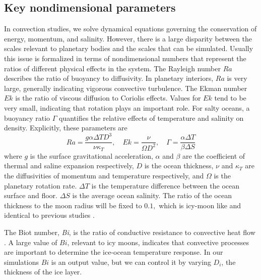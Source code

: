 \documentclass[12pt]{article}
\begin{document}
\subsection{Key nondimensional parameters}
In convection studies, we solve dynamical equations governing the conservation of energy, momentum, and salinity. However, there is a large disparity between the scales relevant to planetary bodies and the scales that can be simulated. 
Usually this issue is formalized in terms of nondimensional numbers that represent the ratios of different physical effects in the system. %
The Rayleigh number $Ra$ describes the ratio of buoyancy to diffusivity. In planetary interiors, $Ra$ is very large, generally indicating vigorous convective turbulence.
The Ekman number $Ek$ is the ratio of viscous diffusion to Coriolis effects. Values for $Ek$ tend to be very small, indicating that rotation plays an important role.
For salty oceans, a buoyancy ratio $\Gamma$ quantifies the relative effects of temperature and salinity on density.
Explicitly, these parameters are
\[Ra = \frac{g\alpha\Delta T D^{3}}{\nu\kappa_{T}},\quad Ek = \frac{\nu}{\Omega D^{2}},\quad \Gamma = \frac{\alpha\Delta T}{\beta \Delta S}\]%
where $g$ is the surface gravitational acceleration, $\alpha$ and $\beta$ are the coefficient of thermal and saline expansion respectively, $D$ is the ocean thickness, $\nu$ and $\kappa_T$ are the diffusivities of momentum and temperature respectively, and $\Omega$ is the planetary rotation rate.
$\Delta T$ is the temperature difference between the ocean surface and floor. $\Delta S$ is the average ocean salinity. 
The ratio of the ocean thickness to the moon radius will be fixed to $0.1,$ which is icy-moon like and identical to previous studies \citep{dL23,kS19}.

The Biot number, \textit{Bi}, is the ratio of conductive resistance to convective heat flow \citep{jL24}. A large value of $Bi$, relevant to icy moons, indicates that convective processes are important to determine the ice-ocean temperature response.
In our simulations $Bi$ is an output value, but we can control it by varying $D_{i}$, the thickness of the ice layer. 
\end{document}
